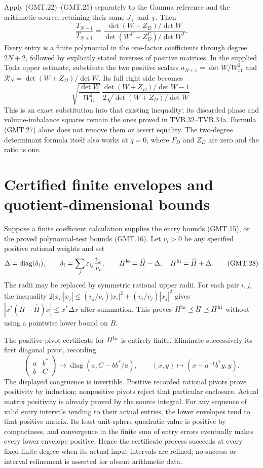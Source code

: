 \documentclass[11pt]{article}
\newcommand{\diag}{\operatorname{diag}}
\begin{document}
Apply (GMT.22)--(GMT.25) separately to the Gamma reference and
the arithmetic source, retaining their same $J_+$ and $\chi$. Then
\[
 \boxed{\frac{T_{N-1}}{T_{N+1}}
 =\frac{\det(W+Z_D)/\det W}
        {\det(W^\Gamma+Z_D^\Gamma)/\det W^\Gamma}.}           \tag{GMT.26}
\]
Every entry is a finite polynomial in the one-factor coefficients
through degree $2N+2$, followed by explicitly stated inverses of
positive matrices. In the supplied Toda upper estimate, substitute
the two positive scalars
$a_{N+1}=\det W/W_{11}^2$ and
$\mathcal R_N=\det(W+Z_D)/\det W$.
Its full right side becomes
\[
 \sqrt{\frac{\det W}{W_{11}^2}}\,
 \frac{\det(W+Z_D)/\det W-1}
      {2\sqrt{\det(W+Z_D)/\det W}}.                            \tag{GMT.27}
\]
This is an exact substitution into that existing inequality; its
discarded phase and volume-imbalance squares remain the ones proved
in TVB.32--TVB.34a. Formula (GMT.27) alone does not remove them or
assert equality. The two-degree determinant formula itself also
works at $q=0$, where $F_D$ and $Z_D$ are zero and the ratio is one.

\section{Certified finite envelopes and quotient-dimensional bounds}

Suppose a finite coefficient calculation supplies the entry bounds
(GMT.15), or the proved polynomial-test bounds (GMT.16).
Let $v_i>0$ be any specified positive rational weights and set
\[
 \Delta=\diag(\delta_i),\qquad
 \delta_i=\sum_j\varepsilon_{ij}\frac{v_j}{v_i},\qquad
 H^{\rm lo}=\widehat H-\Delta,\quad
 H^{\rm hi}=\widehat H+\Delta.                                \tag{GMT.28}
\]
The radii may be replaced by symmetric rational upper radii.
For each pair $i,j$, the inequality
$2|x_i||x_j|\le(v_j/v_i)|x_i|^2+(v_i/v_j)|x_j|^2$
gives $|x^*(H-\widehat H)x|\le x^*\Delta x$ after summation.
This proves $H^{\rm lo}\preceq H\preceq H^{\rm hi}$ without
using a pointwise lower bound on $B$.

The positive-pivot certificate for $H^{\rm lo}$ is entirely finite.
Eliminate successively its first diagonal pivot, recording
\[
 \begin{pmatrix}a&b^*\\b&C\end{pmatrix}
 \longmapsto \diag(a,C-bb^*/a),
 \qquad
 (x,y)\longmapsto(x-a^{-1}b^*y,y).
\]
The displayed congruence is invertible. Positive recorded rational
pivots prove positivity by induction; nonpositive pivots reject that
particular enclosure. Actual matrix positivity is already proved by
the source integral. For any sequence of valid entry intervals tending
to their actual entries, the lower envelopes tend to that positive
matrix. Its least unit-sphere quadratic value is positive by compactness,
and convergence in the finite sum of entry errors eventually makes
every lower envelope positive. Hence the certificate process succeeds
at every fixed finite degree when its actual input intervals are refined;
no success or interval refinement is asserted for absent arithmetic data.
\end{document}
